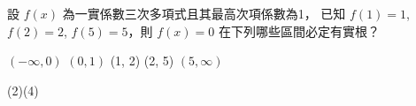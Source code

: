 \begin{QUESTIONS}
\begin{QUESTION}
\begin{ExamAnsRateInfo}{22}{35}{16}{15}
        \end{ExamAnsRateInfo}
        \begin{QBODY}
			設 $f(x)$ 為一實係數三次多項式且其最高次項係數為1， 已知 $f(1)=1$, $f(2)=2$, $f(5)=5$，則 $f(x) = 0$ 在下列哪些區間必定有實根？ 
			\begin{QOPS} 
				\QOP $(-\infty , 0)$ 
				\QOP  $(0, 1)$ 
				\QOP (1, 2) 
				\QOP (2, 5) 
				\QOP $(5, \infty)$ 
			\end{QOPS}
        \end{QBODY}
        \begin{QFROMS}
        \end{QFROMS}
        \begin{QTAGS}\end{QTAGS}
        \begin{QANS}
            (2)(4)
        \end{QANS}
        \begin{QSOLLIST}
        \end{QSOLLIST}
        \begin{QEMPTYSPACE}
        \end{QEMPTYSPACE}
    \end{QUESTION}
\end{QUESTIONS}

